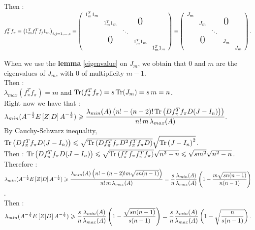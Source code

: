     
Then :\\
$f_{\pi}^{T} f_{\pi} = \pare{1_{m}^{T}f_{i}^{T}f_{j}1_{m}}_{i,j=1,\dots,s} =    \left(
    \begin{array}{ccccc}
    1_{m}^{T}1_{m}                                   \\
      & 1_{m}^{T}1_{m}              &   & \text{\huge0}\\
      &               & \ddots               \\
      & \text{\huge0} &   & 1_{m}^{T}1_{m}            \\
      &               &   &   & 1_{m}^{T}1_{m} 
    \end{array}
    \right) = \left(
    \begin{array}{ccccc}
    J_{m}                                 \\
      & J_{m}              &   & \text{\huge0}\\
      &               & \ddots               \\
      & \text{\huge0} &   & J_{m}          \\
      &               &   &   & J_{m}
    \end{array}
    \right).$
    
    When we use the \textbf{lemma} \ref{eigenvalue} on $J_{m}$, we obtain that $0$ and $m$ are the eigenvalues of $J_{m}$, with $0$ of multiplicity $m-1$.\\
Then :\\
$\lambda_{max}(f_{\pi}^{T}f_{\pi}) = m$ and $\operatorname{Tr}(f_{\pi}^{T} f_{\pi}) = s \operatorname{Tr}(J_{m}) = s\, m = n$.\\

Right now we have that :\\

$\displaystyle \lambda_{min}(A^{-\frac12}E\left[Z|D\right]A^{-\frac12} ) \geqslant \displaystyle  \frac{\lambda_{min}(A) \left( n! - (n-2)! \operatorname{Tr}\left(D f_{\pi}^{T} f_{\pi} D (J-I_{n})\right)    \right)  }{ n! \,m\, \lambda_{max}(A) }. $\\

By Cauchy-Schwarz inequality, $ \operatorname{Tr}\left(D f_{\pi}^{T} f_{\pi} D (J-I_{n})\right) \leqslant  \sqrt{\operatorname{Tr}\left(D f_{\pi}^{T} f_{\pi} D^{2} f_{\pi}^{T} f_{\pi} D \right) }\sqrt{ \operatorname{Tr}\left(J-I_{n}\right)^{2}}$.\\
Then : $ \operatorname{Tr}\left(D f_{\pi}^{T} f_{\pi} D (J-I_{n})\right) \leqslant  \sqrt{\operatorname{Tr}\left( f_{\pi}^{T} f_{\pi} f_{\pi}^{T} f_{\pi} \right) } \sqrt{n^{2}-n}\leqslant \sqrt{s m^{2}}\sqrt{n^{2}-n} $.\\
Therefore :\\
$\displaystyle \lambda_{min}(A^{-\frac12}E\left[Z|D\right]A^{-\frac12} ) \geqslant  \frac{\lambda_{min}(A) \left( n! - (n-2)! m\sqrt{s n (n-1)}   \right)  }{ n! \,m\, \lambda_{max}(A) } =\frac{s}{n} \frac{\lambda_{min}(A)}{\lambda_{max}(A)}\left(1-\frac{m\sqrt{s n (n-1)}}{n(n-1)}\right) $.\\
Then :\\
$\displaystyle \lambda_{min}(A^{-\frac12}E\left[Z|D\right]A^{-\frac12} ) \geqslant \frac{s}{n} \frac{\lambda_{min}(A)}{\lambda_{max}(A)}\left(1-\frac{\sqrt{s n (n-1)}}{s(n-1)}\right) = \frac{s}{n} \frac{\lambda_{min}(A)}{\lambda_{max}(A)}\left(1-\sqrt{\frac{n}{s(n-1)}}\right).$\\

